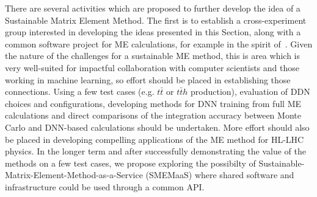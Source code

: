 
There are several activities which are proposed to further develop the idea of a Sustainable Matrix Element Method. The first is to establish a cross-experiment group interested in developing the ideas presented in this Section, along with a common software project for ME calculations, for example in the spirit of~\cite{MoMEMta}. Given the nature of the challenges for a sustainable ME method, this is area which is very well-suited for impactful collaboration with computer scientists and those working in machine learning, so effort should be placed in establishing those connections. Using a few test cases (e.g. $t\bar{t}$ or $t\bar{t}h$ production), evaluation of DDN choices and configurations, developing methods for DNN training from full ME calculations and direct comparisons of the integration accuracy between Monte Carlo and DNN-based calculations should be undertaken. More effort should also be placed in developing compelling applications of the ME method for HL-LHC physics. In the longer term and after successfully demonstrating the value of the methods on a few test cases, we propose exploring the possibilty of Sustainable-Matrix-Element-Method-as-a-Service (SMEMaaS) where shared software and infrastructure could be used through a common API.

